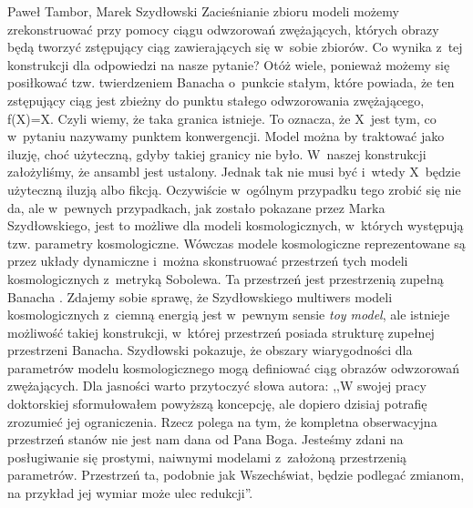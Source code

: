 \begin{artplenv}{Paweł Tambor, Marek Szydłowski}
Zacieśnianie zbioru modeli możemy zrekonstruować przy pomocy ciągu odwzorowań zwężających, których obrazy będą tworzyć zstępujący ciąg zawierających się w~sobie zbiorów. Co wynika z~tej konstrukcji dla odpowiedzi na nasze pytanie? Otóż wiele, ponieważ możemy się posiłkować tzw. twierdzeniem Banacha o~punkcie stałym, które powiada, że ten zstępujący ciąg jest zbieżny do punktu stałego odwzorowania zwężającego, f(X)=X. Czyli wiemy, że taka granica istnieje. To oznacza, że X~jest tym, co w~pytaniu nazywamy punktem konwergencji. Model można by traktować jako iluzję, choć użyteczną, gdyby takiej granicy nie było. W~naszej konstrukcji założyliśmy, że ansambl jest ustalony. Jednak tak nie musi być i~wtedy X~będzie użyteczną iluzją albo fikcją. Oczywiście w~ogólnym przypadku tego zrobić się nie da, ale w~pewnych przypadkach, jak zostało pokazane przez Marka Szydłowskiego, jest to możliwe dla modeli kosmologicznych, w~których występują tzw. parametry kosmologiczne. Wówczas modele kosmologiczne reprezentowane są przez układy dynamiczne i~można skonstruować przestrzeń tych modeli kosmologicznych z~metryką Sobolewa. Ta przestrzeń jest przestrzenią zupełną Banacha
\parencite[][]{szydlowski_cosmological_2007}. %
 Zdajemy sobie sprawę, że Szydłowskiego multiwers modeli kosmologicznych z~ciemną energią jest w~pewnym sensie \textit{toy model}, ale istnieje możliwość takiej konstrukcji, w~której przestrzeń posiada strukturę zupełnej przestrzeni Banacha. Szydłowski pokazuje, że obszary wiarygodności dla parametrów modelu kosmologicznego mogą definiować ciąg obrazów odwzorowań zwężających. Dla jasności warto przytoczyć słowa autora: ,,W swojej pracy doktorskiej sformułowałem powyższą koncepcję, ale dopiero dzisiaj potrafię zrozumieć jej ograniczenia. Rzecz polega na tym, że kompletna obserwacyjna przestrzeń stanów nie jest nam dana od Pana Boga. Jesteśmy zdani na posługiwanie się prostymi, naiwnymi modelami z~założoną przestrzenią parametrów. Przestrzeń ta, podobnie jak Wszechświat, będzie podlegać zmianom, na przykład jej wymiar może ulec redukcji''.


\end{artplenv}
